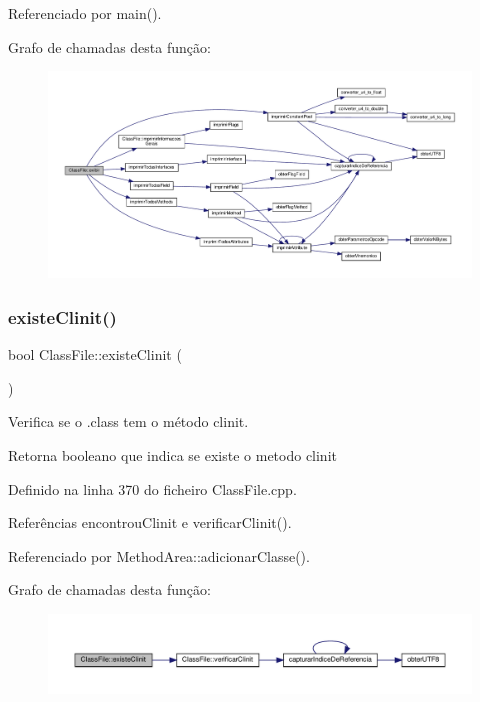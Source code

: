 Referenciado por main().

Grafo de chamadas desta função\+:
\nopagebreak
\begin{figure}[H]
\begin{center}
\leavevmode
\includegraphics[width=350pt]{classClassFile_a7da7cc6de8de3fc6f27faf3b76f4883a_cgraph}
\end{center}
\end{figure}
\mbox{\label{classClassFile_a2a886bdb4c42bfaaf5ea8ff1b2c41209}} 
\subsubsection{\texorpdfstring{existe\+Clinit()}{existeClinit()}}
{\footnotesize\ttfamily bool Class\+File\+::existe\+Clinit (\begin{DoxyParamCaption}{ }\end{DoxyParamCaption})}



Verifica se o .class tem o método clinit. 

\begin{DoxyReturn}{Retorna}
booleano que indica se existe o metodo clinit 
\end{DoxyReturn}


Definido na linha 370 do ficheiro Class\+File.\+cpp.



Referências encontrou\+Clinit e verificar\+Clinit().



Referenciado por Method\+Area\+::adicionar\+Classe().

Grafo de chamadas desta função\+:
\nopagebreak
\begin{figure}[H]
\begin{center}
\leavevmode
\includegraphics[width=350pt]{classClassFile_a2a886bdb4c42bfaaf5ea8ff1b2c41209_cgraph}
\end{center}
\end{figure}
\mbox{\label{classClassFile_a10bfe22492b473fb0197e55f451978e5}} 
